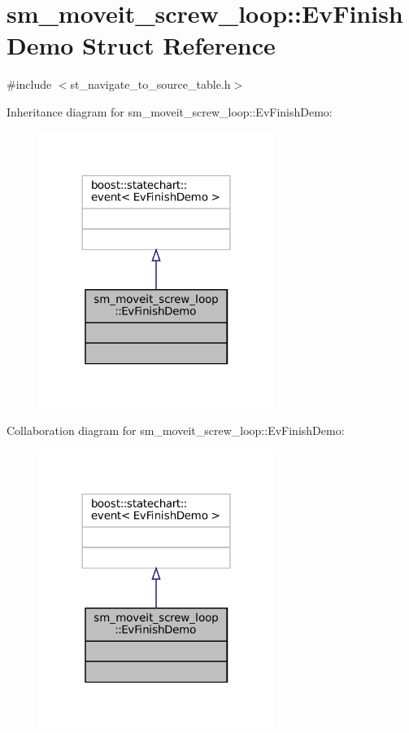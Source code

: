 \hypertarget{structsm__moveit__screw__loop_1_1EvFinishDemo}{}\section{sm\+\_\+moveit\+\_\+screw\+\_\+loop\+:\+:Ev\+Finish\+Demo Struct Reference}
\label{structsm__moveit__screw__loop_1_1EvFinishDemo}


{\ttfamily \#include $<$st\+\_\+navigate\+\_\+to\+\_\+source\+\_\+table.\+h$>$}



Inheritance diagram for sm\+\_\+moveit\+\_\+screw\+\_\+loop\+:\+:Ev\+Finish\+Demo\+:
\nopagebreak
\begin{figure}[H]
\begin{center}
\leavevmode
\includegraphics[width=216pt]{structsm__moveit__screw__loop_1_1EvFinishDemo__inherit__graph}
\end{center}
\end{figure}


Collaboration diagram for sm\+\_\+moveit\+\_\+screw\+\_\+loop\+:\+:Ev\+Finish\+Demo\+:
\nopagebreak
\begin{figure}[H]
\begin{center}
\leavevmode
\includegraphics[width=216pt]{structsm__moveit__screw__loop_1_1EvFinishDemo__coll__graph}
\end{center}
\end{figure}


